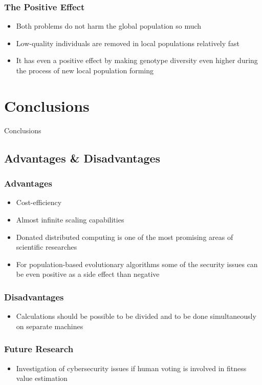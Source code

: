\documentclass{beamer}
\begin{document}
\begin{frame}
\frametitle{The Positive Effect}
\begin{itemize}
	\item Both problems do not harm the global population so much
	\item Low-quality individuals are removed in local populations relatively fast
	\item It has even a positive effect by making genotype diversity even higher during the process of new local population forming
\end{itemize}
\end{frame}

\section{Conclusions}

\begin{frame}
\center \huge{Conclusions}
\end{frame}

\subsection{Advantages \& Disadvantages}

\begin{frame}
\frametitle{Advantages}
\begin{itemize}
	\item Cost-efficiency
	\item Almost infinite scaling capabilities
	\item Donated distributed computing is one of the most promising areas of scientific researches
	\item For population-based evolutionary algorithms some of the security issues can be even positive as a side effect than negative
\end{itemize}
\end{frame}

\begin{frame}
\frametitle{Disadvantages}
\begin{itemize}
	\item Calculations should be possible to be divided and to be done simultaneously on separate machines
\end{itemize}
\end{frame}

\begin{frame}
\frametitle{Future Research}
\begin{itemize}
	\item Investigation of cybersecurity issues if human voting is involved in fitness value estimation
\end{itemize}
\end{frame}
\end{document}
